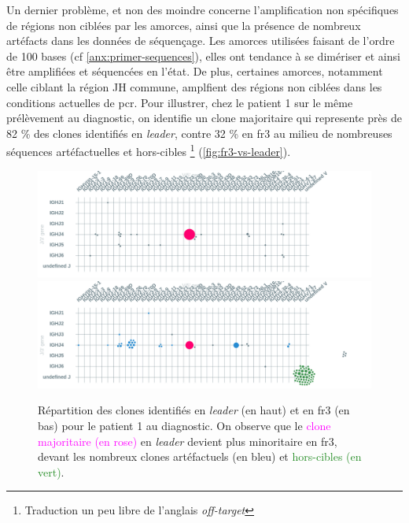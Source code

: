 Un dernier problème, et non des moindre concerne l'amplification non spécifiques de régions non ciblées par les amorces, 
ainsi que la présence de nombreux artéfacts dans les données de séquençage. Les amorces utilisées faisant de l'ordre de 100 bases 
(cf \autoref{anx:primer-sequences}), elles ont tendance à se dimériser et ainsi être amplifiées et séquencées en l'état. 
De plus, certaines amorces, notamment celle ciblant la région JH commune, amplfient des régions non ciblées dans 
les conditions actuelles de \gls{pcr}. Pour illustrer, chez le patient 1 sur le même prélèvement au diagnostic, on identifie 
un clone majoritaire qui represente près de 82 \% des clones identifiés en \textit{leader}, contre 32 \% en \gls{fr}3 au milieu 
de nombreuses séquences artéfactuelles et hors-cibles \footnote{Traduction un peu libre de l'anglais \textit{off-target}} (\autoref{fig:fr3-vs-leader}).

\begin{figure}[H]
    \centering
    \includegraphics[width=1\textwidth]{images/diag_leader.png}
    \vspace{0.5cm}
    \includegraphics[width=1\textwidth]{images/diag_fr3.png}
    \caption{
        Répartition des clones identifiés en \textit{leader} (en haut) et en \gls{fr}3 (en bas) 
        pour le patient 1 au diagnostic. On observe que le \textcolor{Magenta}{clone majoritaire (en rose)} 
        en \textit{leader} devient plus minoritaire en \gls{fr}3, devant les \textcolor{ProcessBlue}{nombreux clones artéfactuels (en bleu)}  
        et \textcolor{ForestGreen}{hors-cibles (en vert)}.
    }
    \label{fig:fr3-vs-leader}
\end{figure}

